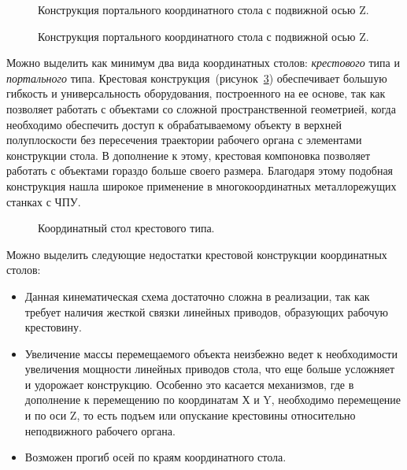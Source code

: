 \begin{figure}[ht]
	\caption{Конструкция портального координатного стола с подвижной осью Z.}\label{fig:cnc-kin-6}
\end{figure}

\begin{figure}[ht]
	\caption{Конструкция портального координатного стола с подвижной осью Z.}\label{fig:cnc-kin-7}
\end{figure}

Можно выделить как минимум два вида координатных столов: \textit{крестового} типа и \textit{портального} типа. Крестовая конструкция~(рисунок~\cref{fig:cross}) обеспечивает большую гибкость и универсальность оборудования, построенного на ее основе, так как позволяет работать с объектами со сложной пространственной геометрией, когда необходимо обеспечить доступ к обрабатываемому объекту в верхней полуплоскости без пересечения траектории рабочего органа с элементами конструкции стола. В дополнение к этому, крестовая компоновка позволяет работать с объектами гораздо больше своего размера. Благодаря этому подобная конструкция нашла широкое применение в многокоординатных металлорежущих станках с ЧПУ.

\begin{figure}[ht]
	\caption{Координатный стол крестового типа.}\label{fig:cross}
\end{figure}

Можно выделить следующие недостатки крестовой конструкции координатных столов:

\begin{itemize}
	\item Данная кинематическая схема достаточно сложна в реализации, так как требует наличия жесткой связки линейных приводов, образующих рабочую крестовину.
	
	\item Увеличение массы перемещаемого объекта неизбежно ведет к необходимости увеличения мощности линейных приводов стола, что еще больше усложняет и удорожает конструкцию. Особенно это касается механизмов, где в дополнение к перемещению по координатам Х и Y, необходимо перемещение и по оси Z, то есть подъем или опускание крестовины относительно неподвижного рабочего органа. 
	
	\item Возможен прогиб осей по краям координатного стола.
\end{itemize}

